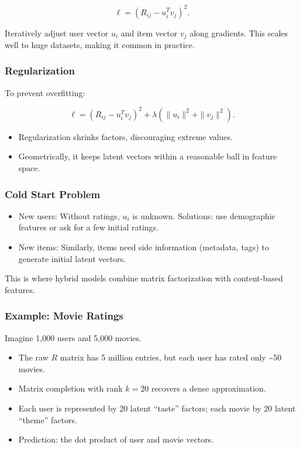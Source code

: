 \documentclass[
  letterpaper,
  DIV=11,
  numbers=noendperiod]{scrreprt}
\providecommand{\tightlist}{%
  \setlength{\itemsep}{0pt}\setlength{\parskip}{0pt}}
\begin{document}
\[
\ell = (R_{ij} - u_i^T v_j)^2.
\]

Iteratively adjust user vector \(u_i\) and item vector \(v_j\) along
gradients. This scales well to huge datasets, making it common in
practice.

\subsubsection{Regularization}\label{regularization}

To prevent overfitting:

\[
\ell = (R_{ij} - u_i^T v_j)^2 + \lambda (\|u_i\|^2 + \|v_j\|^2).
\]

\begin{itemize}
\tightlist
\item
  Regularization shrinks factors, discouraging extreme values.
\item
  Geometrically, it keeps latent vectors within a reasonable ball in
  feature space.
\end{itemize}

\subsubsection{Cold Start Problem}\label{cold-start-problem}

\begin{itemize}
\tightlist
\item
  New users: Without ratings, \(u_i\) is unknown. Solutions: use
  demographic features or ask for a few initial ratings.
\item
  New items: Similarly, items need side information (metadata, tags) to
  generate initial latent vectors.
\end{itemize}

This is where hybrid models combine matrix factorization with
content-based features.

\subsubsection{Example: Movie Ratings}\label{example-movie-ratings}

Imagine 1,000 users and 5,000 movies.

\begin{itemize}
\tightlist
\item
  The raw \(R\) matrix has 5 million entries, but each user has rated
  only \textasciitilde50 movies.
\item
  Matrix completion with rank \(k = 20\) recovers a dense approximation.
\item
  Each user is represented by 20 latent ``taste'' factors; each movie by
  20 latent ``theme'' factors.
\item
  Prediction: the dot product of user and movie vectors.
\end{itemize}
\end{document}
